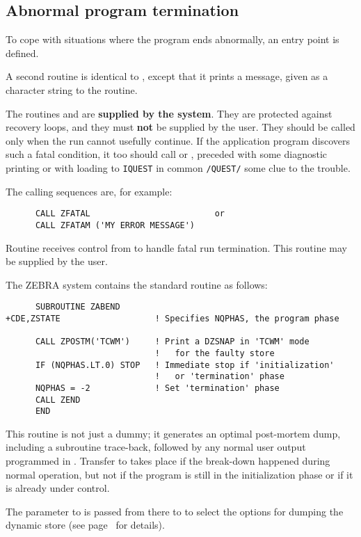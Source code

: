 \subsection{Abnormal program termination}
\par To cope with situations where the program ends abnormally,
an entry point  is defined.
\par A second routine  is identical to ,
except that it prints a message,
given as a character string to the routine.
\par The routines  and  are {\bf supplied by the
system}. They are protected against recovery loops, and they must
{\bf not} be supplied by the user.
They should be called only when the run cannot usefully continue.
If the application program discovers such a fatal condition,
it too should call  or ,
preceded with some diagnostic printing or
with loading to {\tt IQUEST} in common {\tt /QUEST/} some clue to the trouble.
\label{SR_ZFATAL}%
\label{SR_ZFATAM}%
\par The calling sequences are, for example:
\begin{verbatim}
      CALL ZFATAL                         or
      CALL ZFATAM ('MY ERROR MESSAGE')
\end{verbatim}
\par Routine 
\label{SR_ZABEND}%
receives control from  to handle fatal run termination.
This routine may be supplied by the user.
\par The ZEBRA system contains the standard routine as follows:
\begin{verbatim}
      SUBROUTINE ZABEND
+CDE,ZSTATE                   ! Specifies NQPHAS, the program phase
 
      CALL ZPOSTM('TCWM')     ! Print a DZSNAP in 'TCWM' mode
                              !   for the faulty store
      IF (NQPHAS.LT.0) STOP   ! Immediate stop if 'initialization'
                              !   or 'termination' phase
      NQPHAS = -2             ! Set 'termination' phase
      CALL ZEND
      END
\end{verbatim}
\par This  routine is not just a dummy; it generates
an optimal post-mortem
dump, including a subroutine trace-back, followed by any normal
user output programmed in . Transfer to  takes place if
the break-down happened during normal operation, but not if the
program is still in the initialization phase or if it is already under
 control.
\par The parameter to  is passed from there to 
\label{SR_ZPOSTM}%
to select the options for dumping the dynamic store
(see page~\pageref{SR_DZSNAP} for details).
